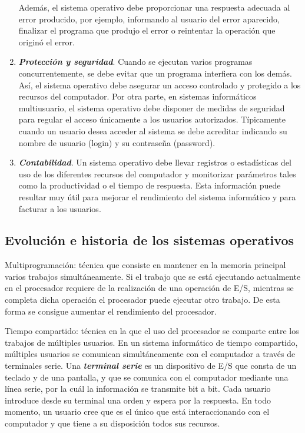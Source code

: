 \documentclass[12pt]{article}
\begin{document}
\begin{enumerate}
Además, el sistema operativo debe proporcionar una respuesta adecuada al error producido, por ejemplo, informando al usuario del error aparecido, finalizar el programa que produjo el error o reintentar la operación que originó el error.

\item \textbf{\textit{Protección y seguridad}}. Cuando se ejecutan varios programas concurrentemente, se debe evitar que un programa interfiera con los demás. Así, el sistema operativo debe asegurar un acceso controlado y protegido a los recursos del computador. Por otra parte, en sistemas informáticos multiusuario, el sistema operativo debe disponer de medidas de seguridad para regular
el acceso únicamente a los usuarios autorizados. Típicamente cuando un usuario desea acceder al
sistema se debe acreditar indicando su nombre de usuario (login) y su contraseña (password).

\item \textbf{\textit{Contabilidad}}. Un sistema operativo debe llevar registros o estadísticas del uso de los diferentes recursos del computador y monitorizar parámetros tales como la productividad o el tiempo de respuesta. Esta información puede resultar muy útil para mejorar el rendimiento del sistema informático y para facturar a los usuarios.
\end{enumerate} 

\subsection{Evolución e historia de los sistemas operativos}

Multiprogramación: técnica que consiste en mantener en la memoria principal varios trabajos simultáneamente. Si el trabajo que se está ejecutando actualmente en el procesador requiere de la realización de una operación de E/S, mientras se completa dicha operación el procesador puede ejecutar otro trabajo. De esta forma se consigue aumentar el rendimiento del procesador.

Tiempo compartido: técnica en la que el uso del procesador se comparte entre los trabajos de múltiples usuarios. En un sistema informático de tiempo compartido, múltiples usuarios se comunican simultáneamente con el computador a través de terminales serie. Una \textbf{\textit{terminal serie}} es un dispositivo de E/S que consta de un teclado y de una pantalla, y que se comunica con el computador mediante una línea serie, por la cuál la información se transmite bit a bit. Cada usuario introduce desde su terminal una orden y espera por la respuesta. En todo momento, un usuario cree que es el único que está interaccionando con el computador y que tiene a su disposición todos sus recursos.
\end{document}
